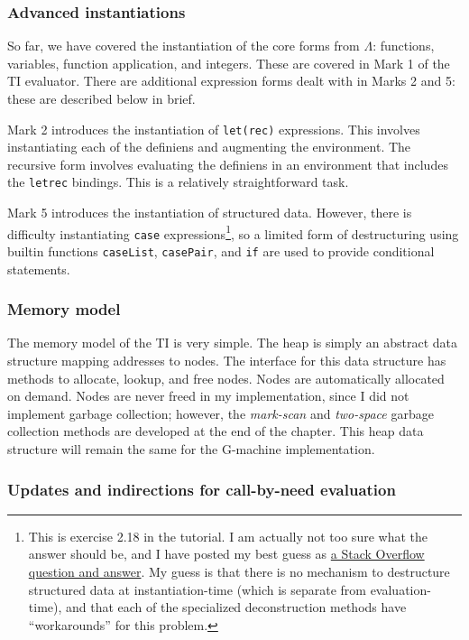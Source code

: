 \subsubsection{Advanced instantiations}
\label{sec:ti-advanced-instantiation}

So far, we have covered the instantiation of the core forms from $\Lambda$: functions, variables, function application, and integers. These are covered in Mark 1 of the TI evaluator. There are additional expression forms dealt with in Marks 2 and 5: these are described below in brief.

Mark 2 introduces the instantiation of \texttt{let(rec)} expressions. This involves instantiating each of the definiens and augmenting the environment. The recursive form involves evaluating the definiens in an environment that includes the \texttt{letrec} bindings. This is a relatively straightforward task.

Mark 5 introduces the instantiation of structured data. However, there is difficulty instantiating \texttt{case} expressions\footnote{This is exercise 2.18 in the tutorial. I am actually not too sure what the answer should be, and I have posted my best guess as \href{https://stackoverflow.com/a/71488865/2397327}{a Stack Overflow question and answer}. My guess is that there is no mechanism to destructure structured data at instantiation-time (which is separate from evaluation-time), and that each of the specialized deconstruction methods have ``workarounds'' for this problem.}, so a limited form of destructuring using builtin functions \texttt{caseList}, \texttt{casePair}, and \texttt{if} are used to provide conditional statements.

\subsubsection{Memory model}
\label{sec:ti-memory}

The memory model of the TI is very simple. The heap is simply an abstract data structure mapping addresses to nodes. The interface for this data structure has methods to allocate, lookup, and free nodes. Nodes are automatically allocated on demand. Nodes are never freed in my implementation, since I did not implement garbage collection; however, the \textit{mark-scan} and \textit{two-space} garbage collection methods are developed at the end of the chapter. This heap data structure will remain the same for the G-machine implementation.

\subsubsection{Updates and indirections for call-by-need evaluation}
\label{sec:ti-updates}

